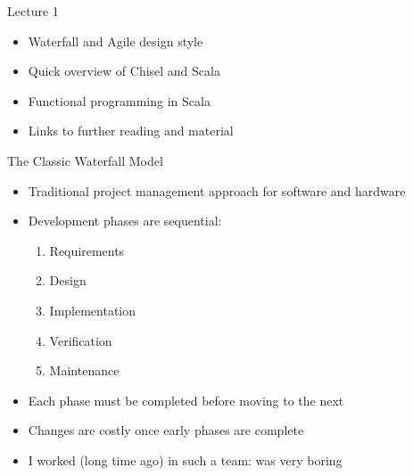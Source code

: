 \begin{frame}[fragile]{Lecture 1}
\begin{itemize}
\item Waterfall and Agile design style
\item Quick overview of Chisel and Scala
\item Functional programming in Scala
\item Links to further reading and material
\end{itemize}
\end{frame}


\begin{frame}{The Classic Waterfall Model}
\begin{itemize}
    \item Traditional project management approach for software and hardware
    \item Development phases are sequential:
    \begin{enumerate}
        \item Requirements
        \item Design
        \item Implementation
        \item Verification
        \item Maintenance
    \end{enumerate}
    \item Each phase must be completed before moving to the next
    \item Changes are costly once early phases are complete
    \item I worked (long time ago) in such a team: was very boring
\end{itemize}
\end{frame}

